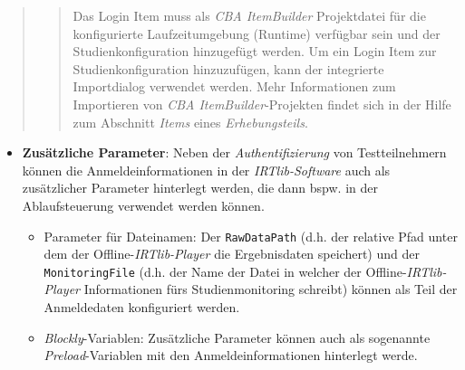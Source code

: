\documentclass[
  letterpaper,
  DIV=11]{scrreprt}
\begin{document}
\begin{tcolorbox}
\begin{quote}
\begin{quote}
Das Login Item muss als \emph{CBA ItemBuilder} Projektdatei für die
konfigurierte Laufzeitumgebung (Runtime) verfügbar sein und der
Studienkonfiguration hinzugefügt werden. Um ein Login Item zur
Studienkonfiguration hinzuzufügen, kann der integrierte Importdialog
verwendet werden. Mehr Informationen zum Importieren von \emph{CBA
ItemBuilder}-Projekten findet sich in der Hilfe zum Abschnitt
\emph{Items} eines \emph{Erhebungsteils}.
\end{quote}
\end{quote}

\begin{itemize}
\item
  \textbf{Zusätzliche Parameter}: Neben der \emph{Authentifizierung} von
  Testteilnehmern können die Anmeldeinformationen in der
  \emph{IRTlib-Software} auch als zusätzlicher Parameter hinterlegt
  werden, die dann bspw. in der Ablaufsteuerung verwendet werden können.

  \begin{itemize}
  \item
    Parameter für Dateinamen: Der \texttt{RawDataPath} (d.h. der
    relative Pfad unter dem der Offline-\emph{IRTlib-Player} die
    Ergebnisdaten speichert) und der \texttt{MonitoringFile} (d.h. der
    Name der Datei in welcher der Offline-\emph{IRTlib-Player}
    Informationen fürs Studienmonitoring schreibt) können als Teil der
    Anmeldedaten konfiguriert werden.
  \item
    \emph{Blockly}-Variablen: Zusätzliche Parameter können auch als
    sogenannte \emph{Preload}-Variablen mit den Anmeldeinformationen
    hinterlegt werde.
  \end{itemize}
\end{itemize}


\end{tcolorbox}
\end{document}
